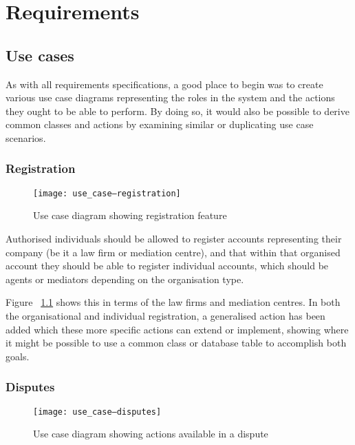 \chapter{Requirements}

\section{Use cases}

As with all requirements specifications, a good place to begin was to create various use case diagrams representing the roles in the system and the actions they ought to be able to perform. By doing so, it would also be possible to derive common classes and actions by examining similar or duplicating use case scenarios.

\subsection{Registration}

\begin{figure}[h!]
  \centering
    \texttt{[image: use\_case--registration]}
  \caption{Use case diagram showing registration feature}
  \label{uml:useCase:registration}
\end{figure}

Authorised individuals should be allowed to register accounts representing their company (be it a law firm or mediation centre), and that within that organised account they should be able to register individual accounts, which should be agents or mediators depending on the organisation type.

Figure ~\ref{uml:useCase:registration} shows this in terms of the law firms and mediation centres. In both the organisational and individual registration, a generalised action has been added which these more specific actions can extend or implement, showing where it might be possible to use a common class or database table to accomplish both goals.

\subsection{Disputes}

\begin{figure}[h!]
  \centering
    \texttt{[image: use\_case--disputes]}
  \caption{Use case diagram showing actions available in a dispute}
  \label{uml:useCase:disputes}
\end{figure}

